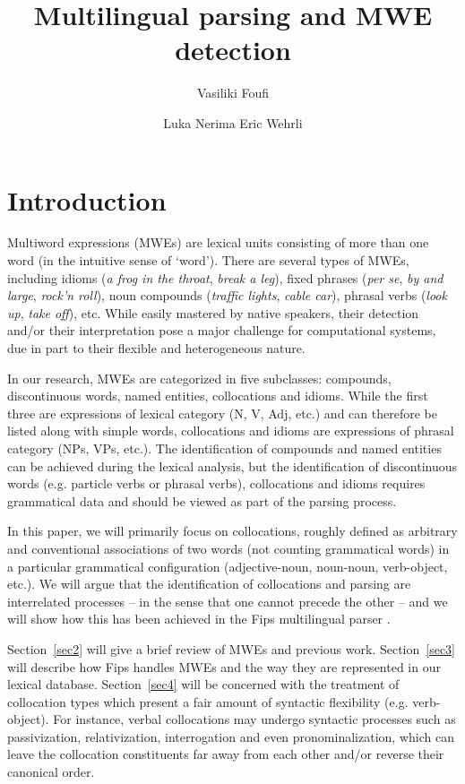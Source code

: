 \documentclass[output=paper]{langsci/langscibook}
\title{Multilingual parsing and {M}{W}{E} detection}
\author{%
Vasiliki Foufi\affiliation{University of Geneva}\and 
Luka Nerima\affiliation{University of Geneva}\lastand 
Eric Wehrli\affiliation{University of Geneva}%
}
\begin{document}
\maketitle

\section{Introduction}

Multiword expressions (MWEs) are lexical units consisting of more than one word (in the intuitive sense of `word'). There are several types of MWEs, including idioms (\textit{a frog in the throat}, \textit{break a leg}), fixed phrases (\textit{per se}, \textit{by and large}, \textit{rock'n roll}), noun compounds (\textit{traffic lights}, \textit{cable car}), phrasal verbs (\textit{look up}, \textit{take off}), etc. While easily mastered by native speakers, their detection and/or their interpretation pose a major challenge for computational systems, due in part to their flexible and heterogeneous nature. 

In our research, MWEs are categorized in five subclasses: compounds, discontinuous words, named entities, collocations and idioms. While the first three are expressions of lexical category (N, V, Adj, etc.) and can therefore be listed along with simple words, collocations and idioms are expressions of phrasal category (NPs, VPs, etc.). The identification of compounds and named entities can be achieved during the lexical analysis, but the identification of discontinuous words (e.g. particle verbs or phrasal verbs), collocations and idioms requires grammatical data and should be viewed as part of the parsing process. 

In this paper, we will primarily focus on collocations, roughly defined as arbitrary and conventional associations of two words (not counting grammatical words) in a particular grammatical configuration (adjective-noun, noun-noun, verb-object, etc.). We will
argue that the identification of collocations and parsing are interrelated processes -- in the sense that one cannot precede the other --  and we will show how this has been achieved in the Fips multilingual parser \citep{wehrli07,wn15}.%

Section~\ref{sec2} will give a brief review of MWEs and previous work. Section~\ref{sec3} will describe how Fips handles MWEs and the way they are represented in our lexical database. Section~\ref{sec4} will be concerned with the treatment of collocation types which present a fair amount of syntactic flexibility (e.g. verb-object). For instance, verbal collocations may undergo syntactic processes such as passivization, relativization, interrogation and even pronominalization, which can leave the collocation constituents far away from each other and/or reverse their canonical order.
\end{document}

